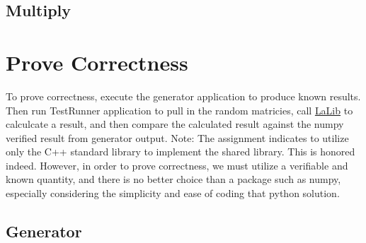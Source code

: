 \begin{DoxyCode}{0}
\DoxyCodeLine{}
\DoxyCodeLine{}
\end{DoxyCode}
\hypertarget{index_multiply_subc}{}\subsection{Multiply}\label{index_multiply_subc}

\begin{DoxyCode}{0}
\DoxyCodeLine{}
\DoxyCodeLine{}
\DoxyCodeLine{}
\end{DoxyCode}
\hypertarget{index_correctness_sec}{}\section{Prove Correctness}\label{index_correctness_sec}
To prove correctness, execute the generator application to produce known results. Then run Test\+Runner application to pull in the random matricies, call \mbox{\hyperlink{namespaceLaLib}{La\+Lib}} to calculcate a result, and then compare the calculated result against the numpy verified result from generator output. Note\+: The assignment indicates to utilize only the C++ standard library to implement the shared library. This is honored indeed. However, in order to prove correctness, we must utilize a verifiable and known quantity, and there is no better choice than a package such as numpy, especially considering the simplicity and ease of coding that python solution.\hypertarget{index_gen_subc}{}\subsection{Generator}\label{index_gen_subc}
